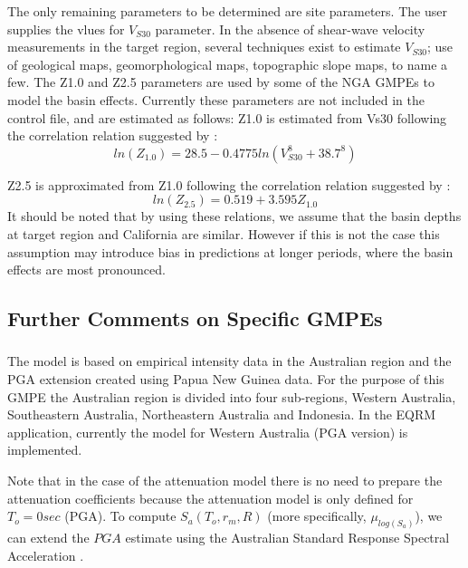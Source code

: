The only remaining parameters to be determined are site parameters.
The user supplies the vlues for $V_{S30}$ parameter. In the absence
of shear-wave velocity measurements in the target region, several
techniques exist to estimate $V_{S30}$; use of geological maps,
geomorphological maps, topographic slope maps, to name a few. The
Z1.0 and Z2.5 parameters are used by some of the NGA GMPEs to model
the basin effects. Currently these parameters are not included in
the control file, and are estimated as follows: Z1.0 is estimated
from Vs30 following the correlation relation suggested by
\citet{eqrm_Chiou08}:
\begin{equation}
ln(Z_{1.0}) = 28.5-0.4775ln(V_{S30}^8+38.7^8)
\end{equation}

Z2.5 is approximated from Z1.0 following the correlation relation
suggested by \citet{eqrm_Campbell07}:
\begin{equation}
ln(Z_{2.5}) = 0.519+3.595Z_{1.0}
\end{equation}
It should be noted that by using these relations, we assume that the
basin depths at target region and California are similar. However if
this is not the case this assumption may introduce bias in
predictions at longer periods, where the basin effects are most
pronounced.

\subsection{Further Comments on Specific GMPEs}

\subsubsection{\citet{eqrm_Gaull90a}}
The \citet{eqrm_Gaull90a} model is based on empirical intensity data
in the Australian region and the PGA extension created using Papua
New Guinea data. For the purpose of this GMPE the Australian region
is divided into four sub-regions, Western Australia, Southeastern
Australia, Northeastern Australia and Indonesia. In the EQRM
application, currently the model for Western Australia (PGA version)
is implemented.

Note that in the case of the \citet{eqrm_Gaull90a} attenuation model
there is no need to prepare the attenuation coefficients because the
attenuation model is only defined for $T_o=0 sec$ (PGA). To compute
$S_a(T_o,r_m,R)$ (more specifically, $\mu_{log(S_a)}$), we can
extend the $PGA$ estimate using the Australian Standard Response
Spectral Acceleration \citep{eqrm_Aus93}.

